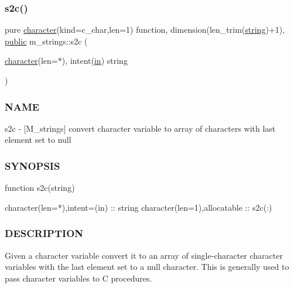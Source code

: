 \mbox{\label{namespacem__strings_a9a3d38d8e7c4212d63487b9b46bec3b7}} 
\subsubsection{\texorpdfstring{s2c()}{s2c()}}
{\footnotesize\ttfamily pure \hyperlink{option__stopwatch_83_8txt_abd4b21fbbd175834027b5224bfe97e66}{character}(kind=c\+\_\+char,len=1) function, dimension(len\+\_\+trim(\hyperlink{what__overview_81_8txt_a74cb7e955273b9f9157b4f0c18a38849}{string})+1), \hyperlink{M__stopwatch_83_8txt_a2f74811300c361e53b430611a7d1769f}{public} m\+\_\+strings\+::s2c (\begin{DoxyParamCaption}\item[{\hyperlink{option__stopwatch_83_8txt_abd4b21fbbd175834027b5224bfe97e66}{character}(len=$\ast$), intent(\hyperlink{M__journal_83_8txt_afce72651d1eed785a2132bee863b2f38}{in})}]{string }\end{DoxyParamCaption})}



\subsubsection*{N\+A\+ME}

s2c -\/ \mbox{[}M\+\_\+strings\mbox{]} convert character variable to array of characters with last element set to null 

\subsubsection*{S\+Y\+N\+O\+P\+S\+IS}

\begin{DoxyVerb}function s2c(string)

 character(len=*),intent=(in)  :: string
 character(len=1),allocatable  :: s2c(:)
\end{DoxyVerb}
 \subsubsection*{D\+E\+S\+C\+R\+I\+P\+T\+I\+ON}

Given a character variable convert it to an array of single-\/character character variables with the last element set to a null character. This is generally used to pass character variables to C procedures.

